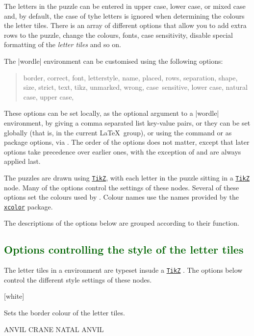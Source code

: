 \documentclass[svgnames]{report}
\newcommand\ctan[1]{\href{https://www.ctan.org/pkg/#1}{\texttt{#1}}}
\newcommand\Section[1]{\subsection{\textcolor{DarkGreen}{#1}}}
\begin{document}
  The letters in the puzzle can be entered in upper case, lower case, or
  mixed case and, by default, the case of tyhe letters is ignored when
  determining the colours the letter tiles.  There is an array of
  different options that allow you to add extra rows to the puzzle,
  change the colours, fonts, case sensitivity, disable special
  formatting of the \textit{letter tiles} and so on.

  The \keyword|wordle| environment can be customised using the
  following options:
  \begin{quote}\sffamily\color{DarkGreen}
    border,
    correct,
    font,
    letterstyle,
    name,
    placed,
    rows,
    separation,
    shape,
    size,
    strict,
    text,
    tikz,
    unmarked,
    wrong,
    case~sensitive,
    lower case,
    natural case,
    upper case,
  \end{quote}
  These options can be set locally, as the optional argument to a
  \keyword|wordle| environment, by giving a comma separated list
  key-value pairs, or they can be set globally (that is, in the current
  \LaTeX\ group), or using the \keyword{\WordleSetup} command
  or as package options, via
  \keyword{\usepackage[options]{wordle}}. The order of the options
  does not matter, except that later options take precedence over
  earlier ones, with the exception of  and
   are always applied last.

  The  puzzles are drawn using \ctan{TikZ}, with each
  letter in the puzzle sitting in a \ctan{TikZ} node. Many of the
  options control the settings of these nodes. Several of these options
  set the colours used by . Colour names use the
   names provided by the \ctan{xcolor} package.

  The descriptions of the options below are grouped according to their
  function.

  \Section{Options controlling the style of the letter tiles}

  The letter tiles in a  environment are typeset insude
  a \ctan{TikZ} \keyword{\node}. The options below control the different
  style settings of these nodes.

  [white]

  Sets the border colour of the  letter tiles.

  \begin{example}
    \begin{wordle}[border=red]{ANVIL}
      CRANE
      NATAL
      ANVIL
    \end{wordle}
  \end{example}
\end{document}
